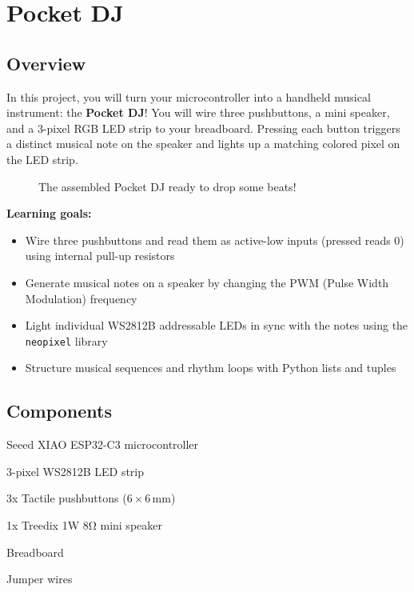 \chapter{Pocket DJ}

\section{Overview}
In this project, you will turn your microcontroller into a handheld musical instrument: the \textbf{Pocket DJ}!
You will wire three pushbuttons, a mini speaker, and a 3-pixel RGB LED strip to your breadboard.
Pressing each button triggers a distinct musical note on the speaker and lights up a matching colored pixel on the LED strip.

\begin{figure}[H]
\centering
    \caption{The assembled Pocket DJ ready to drop some beats!}
\end{figure}

\begin{tcolorbox}[colback=blue!5!white,colframe=blue!40!black]
    \textbf{Learning goals:}
    \begin{itemize}
        \item Wire three pushbuttons and read them as active-low inputs (pressed reads 0) using internal
              pull-up resistors
        \item Generate musical notes on a speaker by changing the PWM (Pulse Width Modulation) frequency
        \item Light individual WS2812B addressable LEDs in sync with the notes using the \texttt{neopixel}
              library
        \item Structure musical sequences and rhythm loops with Python lists and tuples
    \end{itemize}
\end{tcolorbox}

\pagebreak

\section{Components}
\begin{components}
    \item Seeed XIAO ESP32-C3 microcontroller
    \item 3-pixel WS2812B LED strip
    \item 3x Tactile pushbuttons ($6\times6$\,mm)
    \item 1x Treedix 1W 8\si{\ohm} mini speaker
    \item Breadboard
    \item Jumper wires
\end{components}

